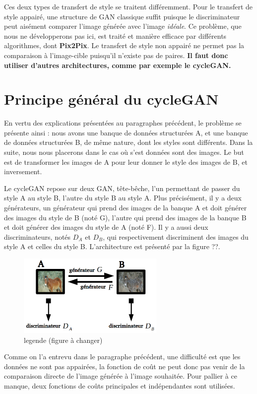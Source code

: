 Ces deux types de transfert de style se traitent différemment. Pour le transfert de style appairé, une structure de GAN classique suffit puisque le discriminateur peut aisément comparer l'image générée avec l'image \textit{idéale}. Ce problème, que nous ne développerons pas ici, est traité et manière efficace par différents algorithmes, dont \textbf{Pix2Pix}. Le transfert de style non appairé ne permet pas la comparaison à l'image-cible puisqu'il n'existe pas de paires. \textbf{Il faut donc utiliser d'autres architectures, comme par exemple le cycleGAN.}


\section{Principe général du cycleGAN}

En vertu des explications présentées au paragraphes précédent, le problème se présente ainsi : nous avons une banque de données structurées A, et une banque de données structurées B, de même nature, dont les styles sont différents. Dans la suite, nous nous placerons dans le cas où s'est données sont des images. Le but est de transformer les images de A pour leur donner le style des images de B, et inversement.

Le cycleGAN repose sur deux GAN, tête-bêche, l'un permettant de passer du style A au style B, l'autre du style B au style A. Plus précisément, il y a deux générateurs, un générateur qui prend des images de la banque A et doit générer des images du style de B (noté G), l'autre qui prend des images de la banque B et doit générer des images du style de A (noté F). Il y a aussi deux discriminateurs, notés $D_A$ et $D_B$, qui respectivement discriminent des images du style A et celles du style B. L'architecture est présenté par la figure ??.

\begin{figure}[!h]
\centering
\includegraphics[width=200pt]{"images/cycleDouble"}
\caption{legende (figure à changer)}
\end{figure}

Comme on l'a entrevu dans le paragraphe précédent, une difficulté est que les données ne sont pas appairées, la fonction de coût ne peut donc pas venir de la comparaison directe de l'image générée à l'image souhaitée. Pour pallier à ce manque, deux fonctions de coûts principales et indépendantes sont utilisées.\\

